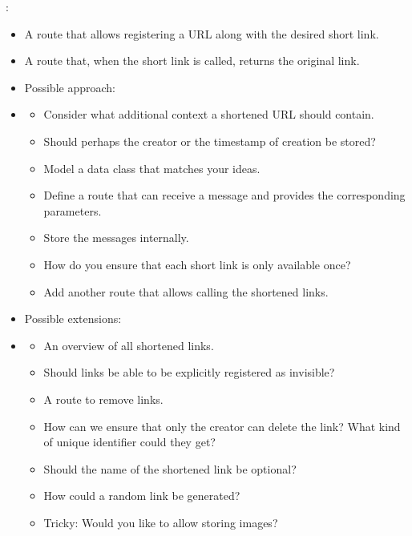 \documentclass{config/minimal_uebungszettel}
\theoremstyle{definition}
\begin{document}
        \medskip
        :
        \begin{itemize}
            \item A route that allows registering a URL along with the desired short link.
            \item A route that, when the short link is called, returns the original link.
            \item[] Possible approach:
            \item[] \begin{itemize}
                \item Consider what additional context a shortened URL should contain.
                \item[] Should perhaps the creator or the timestamp of creation be stored?
                \item Model a data class that matches your ideas.
                \item Define a route that can receive a message and provides the corresponding parameters.
                \item Store the messages internally.
                \item[] How do you ensure that each short link is only available once?
                \item Add another route that allows calling the shortened links.
            \end{itemize}
            \item Possible extensions:
            \item[] \begin{itemize}
                \item An overview of all shortened links.
                \item[] Should links be able to be explicitly registered as invisible?
                \item A route to remove links.
                \item[] How can we ensure that only the creator can delete the link? What kind of unique identifier could they get?
                \item Should the name of the shortened link be optional?
                \item[] How could a random link be generated?
                \item Tricky: Would you like to allow storing images?
            \end{itemize}
        \end{itemize}
\end{document}
